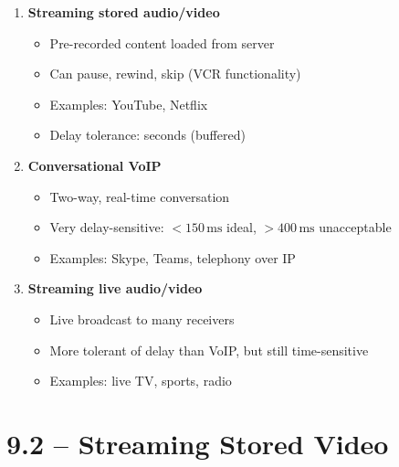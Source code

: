 \begin{tcolorbox}[keybox, title=Three types of multimedia applications]
\begin{enumerate}[nosep]
  \item \textbf{Streaming stored audio/video}
    \begin{itemize}[nosep]
      \item Pre-recorded content loaded from server
      \item Can pause, rewind, skip (VCR functionality)
      \item Examples: YouTube, Netflix
      \item Delay tolerance: seconds (buffered)
    \end{itemize}
  \item \textbf{Conversational VoIP}
    \begin{itemize}[nosep]
      \item Two-way, real-time conversation
      \item Very delay-sensitive: $<150\,\text{ms}$ ideal, $>400\,\text{ms}$ unacceptable
      \item Examples: Skype, Teams, telephony over IP
    \end{itemize}
  \item \textbf{Streaming live audio/video}
    \begin{itemize}[nosep]
      \item Live broadcast to many receivers
      \item More tolerant of delay than VoIP, but still time-sensitive
      \item Examples: live TV, sports, radio
    \end{itemize}
\end{enumerate}
\end{tcolorbox}

\begin{imagebox}
\end{imagebox}

\section{9.2 -- Streaming Stored Video}

